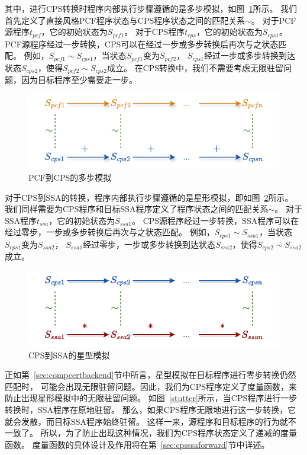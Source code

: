 其中，进行CPS转换时程序内部执行步骤遵循的是多步模拟，如图~\ref{plus}所示。
我们首先定义了直接风格PCF程序状态与CPS程序状态之间的匹配关系$\sim$。
对于PCF源程序$t_{pcf}$，它的初始状态为$S_{pcf1}$。
对于CPS程序$t_{cps}$，它的初始状态为$S_{cps1}$。
PCF源程序经过一步转换，CPS可以在经过一步或多步转换后再次与之状态匹配。
例如，$S_{pcf1}\sim S_{cps1}$，当状态$S_{pcf1}$变为$S_{pcf2}$，
$S_{cps1}$经过一步或多步转换到达状态$S_{cps2}$，使得$S_{pcf2}\sim S_{cps2}$成立。
在CPS转换中，我们不需要考虑无限驻留问题，因为目标程序至少需要走一步。

\begin{figure}[htbp]
    \centering
    \vspace{2ex}
    \includegraphics[width=0.75\linewidth]{figures/plus.drawio.pdf}
    \caption{PCF到CPS的多步模拟}\label{plus}
\end{figure}

对于CPS到SSA的转换，程序内部执行步骤遵循的是星形模拟，即如图~\ref{star}所示。
我们同样需要为CPS程序和目标SSA程序定义了程序状态之间的匹配关系$\sim$。
对于SSA程序$t_{ssa}$，它的初始状态为$S_{ssa1}$。
CPS源程序经过一步转换，SSA程序可以在经过零步，一步或多步转换后再次与之状态匹配。
例如，$S_{cps1}\sim S_{ssa1}$，当状态$S_{cps1}$变为$S_{ssa2}$，
$S_{ssa1}$经过零步，一步或多步转换到达状态$S_{ssa2}$，使得$S_{cps2}\sim S_{ssa2}$成立。

\begin{figure}[htbp]
    \centering
    \vspace{2ex}
    \includegraphics[width=0.75\linewidth]{figures/star.drawio.pdf}
    \caption{CPS到SSA的星型模拟}\label{star}
\end{figure}

正如第~\ref{sec:compcertbackend}节中所言，星型模拟在目标程序进行零步转换仍然匹配时，
可能会出现无限驻留问题。因此，我们为CPS程序定义了度量函数，来防止出现星形模拟中的无限驻留问题。
如图~\ref{stutter}所示，当CPS程序进行一步转换时，SSA程序在原地驻留。
那么，如果CPS程序无限地进行这一步转换，它就会发散，而目标SSA程序始终驻留。
这样一来，源程序和目标程序的行为就不一致了。
所以，为了防止出现这种情况，我们为CPS程序状态定义了递减的度量函数。
度量函数的具体设计及作用将在第~\ref{sec:cpsssaforward}节中详述。


